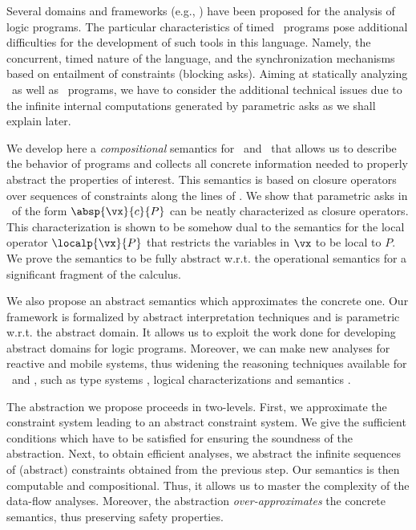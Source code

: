 \documentclass{tlp}
\begin{document}
Several domains and frameworks (e.g., \cite{CC92,armstrong98two,Codish99} )  
have been proposed  for the analysis of logic programs. The particular characteristics  of  timed \ccp\  programs  pose additional difficulties 
for the development of such tools in this language. Namely, 
 the concurrent, timed nature of the language, and the synchronization mechanisms based on  entailment of constraints (blocking asks). 
 Aiming at statically analyzing \utcc\ as well as \tccp\  programs, we have to  consider the additional technical issues due to  the infinite internal computations generated by parametric asks as we shall explain later.  
 
 
We develop here a \emph{compositional} semantics for \tccp\ and \utcc\ that 
allows us to describe the behavior of programs and collects all concrete 
information needed to properly abstract the properties of interest. This 
semantics is  based on closure operators over sequences of constraints  
along the lines of \cite{tcc-lics94}.  
We show that parametric asks in \utcc\ of the form  $\absp{\vx}{c}{P}$  can 
be neatly characterized as  closure operators. This characterization is 
shown to be somehow dual to the semantics for the local operator 
$\localp{\vx}{P}$ that restricts the variables in $\vx$ to be local to $P$. 
We  prove  the
 semantics  to be  fully 
 abstract w.r.t.  the operational semantics for a significant fragment of the  
 calculus.


We  also propose an abstract   semantics which approximates the  concrete one.  Our  framework is formalized by  abstract interpretation techniques and is  parametric w.r.t. 
 the abstract domain. It  allows us to exploit  the work done for developing abstract domains for 
 logic programs. Moreover, we can make new analyses for reactive 
 and mobile systems, thus widening the reasoning techniques   available for   \tccp\ and \utcc, such as 
type systems \cite{Lopez09}, logical characterizations \cite{MendlerPSS95,NPV02,Olarte:08:SAC} and semantics \cite{tcc-lics94,BoerPP95,NPV02}. 
 
 
The abstraction we propose proceeds in two-levels. First, we approximate the  
constraint system leading to an abstract constraint system. We give the sufficient 
conditions which 
have to be satisfied for ensuring the soundness of the abstraction. Next, to obtain efficient analyses, we abstract the infinite sequences of (abstract) constraints obtained from the previous step. Our semantics is then computable and compositional. Thus, it allows us to  master  the complexity of the data-flow analyses. Moreover, 
the  abstraction  \emph{over-approximates} the concrete semantics, thus preserving safety properties.
\end{document}
